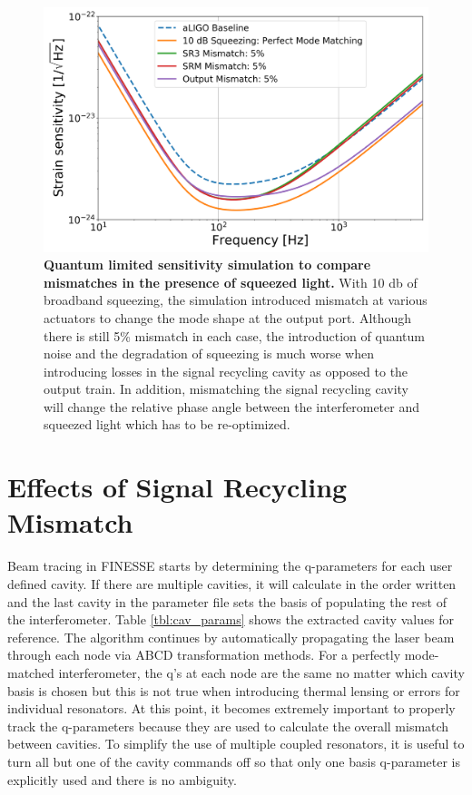 	\begin{figure}[ht]
		\centering
		\includegraphics[width=1.0 \textwidth]{../Figures/QM_sens_compare_mismatches.png}
		\caption[Quantum limited sensitivity simulation to compare mismatches in the presence of squeezed light.]
		{\textbf{Quantum limited sensitivity simulation to compare mismatches in the presence of squeezed light.} 
			With 10 db of broadband squeezing, the simulation introduced mismatch at various actuators to change the mode shape at the output port.  Although there is still 5\% mismatch in each case, the introduction of quantum noise and the degradation of squeezing is much worse when introducing losses in the signal recycling cavity as opposed to the output train.  In addition, mismatching the signal recycling cavity will change the relative phase angle between the interferometer and squeezed light which has to be re-optimized.	
		}
		\label{fig:QM_lim_sens_mismatch}
	\end{figure}
	\section{Effects of Signal Recycling Mismatch}
	Beam tracing in FINESSE starts by determining the q-parameters for each user defined cavity. If there are multiple cavities, it will calculate in the order written and the last cavity in the parameter file sets the basis of populating the rest of the interferometer.  Table \ref{tbl:cav_params} shows the extracted cavity values for reference.  The algorithm continues by automatically propagating the laser beam through each node via ABCD transformation methods. For a perfectly mode-matched interferometer, the q's at each node are the same no matter which cavity basis is chosen but this is not true when introducing thermal lensing or errors for individual resonators.   At this point, it becomes extremely important to properly track the q-parameters because they are used to calculate the overall mismatch between cavities. To simplify the use of multiple coupled resonators, it is useful to turn all but one of the cavity commands off so that only one basis q-parameter is explicitly used and there is no ambiguity.  
	
